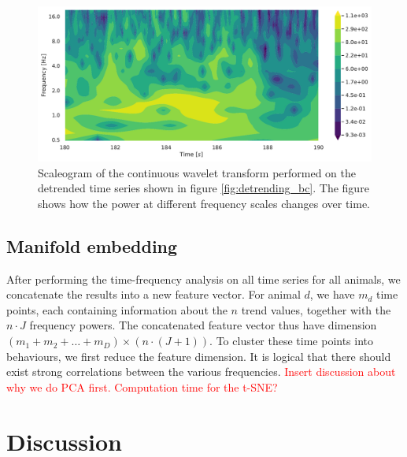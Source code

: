 \documentclass[a4paper]{memoir}
\theoremstyle{plain}
\theoremstyle{definition}
\theoremstyle{remark}
\begin{document}
\begin{figure}[tb]
        \centering
        \includegraphics[width=\linewidth]{./code/figures/scaleograms/scaleogram_animal_1_BackPitch.pdf}
        \caption{Scaleogram of the continuous wavelet transform performed on the detrended time series shown in figure \ref{fig:detrending_bc}.
        The figure shows how the power at different frequency scales changes over time.}
        \label{fig:scaleogram_bc}
\end{figure}




\section{Manifold embedding}
After performing the time-frequency analysis on all time series for all animals, we concatenate the results into a new feature vector.
For animal $d$, we have $m_d$ time points, each containing information about the $n$ trend values, together with the $n \cdot J$ frequency powers.
The concatenated feature vector thus have dimension $(m_1 + m_2 + \hdots + m_D) \times (n \cdot (J + 1))$.
To cluster these time points into behaviours, we first reduce the feature dimension.
It is logical that there should exist strong correlations between the various frequencies.
\textcolor{red}{Insert discussion about why we do PCA first. Computation time for the t-SNE?}







\chapter{Discussion}
\end{document}
